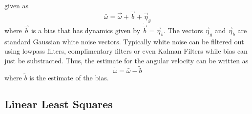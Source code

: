 \documentclass{article}
\begin{document}
given as
\begin{equation}
  \bar{\omega} = \vec{\omega} + \vec{b} + \vec{\eta}_g
\end{equation}
where $\vec{b}$ is a bias that has dynamics given by
$\dot{\vec{b}}=\vec{\eta}_b$. The vectors $\vec{\eta}_g$ and
$\vec{\eta}_b$ are standard Gaussian white noise vectors. Typically
white noise can be filtered out using lowpass filters, complimentary
filters or even Kalman Filters while bias can just be
substracted. Thus, the estimate for the angular velocity can be
written as
\begin{equation}
  \tilde{\omega} = \bar{\omega}-\tilde{b}
\end{equation}
where $\tilde{b}$ is the estimate of the bias.

\subsection{Linear Least Squares}
\end{document}
